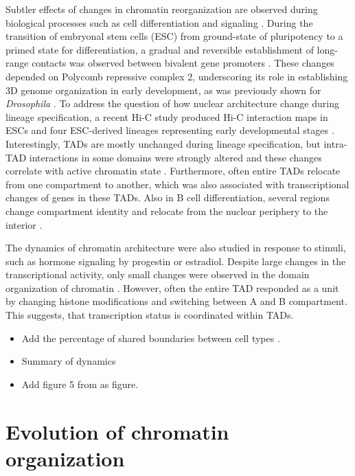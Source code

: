 \documentclass[a4paper,twoside=true,openright,parskip=full,chapterprefix=true,11pt,headings=normal,bibliography=totoc,listof=totoc,titlepage=on,captions=tableabove,draft=false]{scrreprt}
\providecommand{\tightlist}{%
  \setlength{\itemsep}{0pt}\setlength{\parskip}{0pt}}
\theoremstyle{definition}
\theoremstyle{definition}
\theoremstyle{definition}
\theoremstyle{remark}
\begin{document}
Subtler effects of changes in chromatin reorganization are observed
during biological processes such as cell differentiation and signaling
\citep{Bonev2016}. During the transition of embryonal stem cells (ESC)
from ground-state of pluripotency to a primed state for differentiation,
a gradual and reversible establishment of long-range contacts was
observed between bivalent gene promoters \citep{Joshi2015}. These
changes depended on Polycomb repressive complex 2, underscoring its role
in establishing 3D genome organization in early development, as was
previously shown for \emph{Drosophila} \citep{Bantignies2011}. To
address the question of how nuclear architecture change during lineage
specification, a recent Hi-C study produced Hi-C interaction maps in
ESCs and four ESC-derived lineages representing early developmental
stages \citep{Dixon2015}. Interestingly, TADs are mostly unchanged
during lineage specification, but intra-TAD interactions in some domains
were strongly altered and these changes correlate with active chromatin
state \citep{Dixon2015}. Furthermore, often entire TADs relocate from
one compartment to another, which was also associated with
transcriptional changes of genes in these TADs. Also in B cell
differentiation, several regions change compartment identity and
relocate from the nuclear periphery to the interior \citep{Lin2012}.

The dynamics of chromatin architecture were also studied in response to
stimuli, such as hormone signaling by progestin or estradiol. Despite
large changes in the transcriptional activity, only small changes were
observed in the domain organization of chromatin \citep{LeDily2014}.
However, often the entire TAD responded as a unit by changing histone
modifications and switching between A and B compartment. This suggests,
that transcription status is coordinated within TADs.

\begin{itemize}
\tightlist
\item
  Add the percentage of shared boundaries between cell types
  \citep{Dixon2012, Rao2014}.
\item
  Summary of dynamics
\item
  Add figure 5 from \citep{Andrey2017} as figure.
\end{itemize}

\hypertarget{evolution-of-chromatin-organization}{%
\section{Evolution of chromatin
organization}\label{evolution-of-chromatin-organization}}
\end{document}
